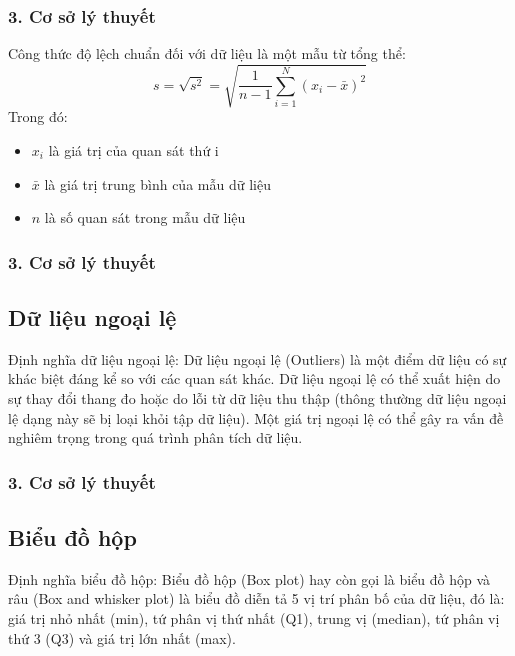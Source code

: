 \documentclass[english,10pt,table]{beamer}
\begin{document}
\begin{frame}
\frametitle{3. Cơ sở lý thuyết}
\begin{block}
{Công thức độ lệch chuẩn đối với dữ liệu là một mẫu từ tổng thể:} 
$$
s=\sqrt{s^{2}}=\sqrt{\frac{1}{n-1} \sum_{i=1}^{N}\left(x_{i}-\bar{x}\right)^{2}}
$$
Trong đó: 
\begin{itemize}
    \item $x_{i}$ là giá trị của quan sát thứ i
    \item $\bar{x}$ là giá trị trung bình của mẫu dữ liệu
    \item $n$ là số quan sát trong mẫu dữ liệu
\end{itemize}
\end{block}
\end{frame}

\begin{frame}
\frametitle{3. Cơ sở lý thuyết}
\subsection{Dữ liệu ngoại lệ}
\begin{block}
{Định nghĩa dữ liệu ngoại lệ:} 
Dữ liệu ngoại lệ (Outliers) là một điểm dữ liệu có sự khác biệt đáng kể so với các quan sát khác. Dữ liệu ngoại lệ có thể xuất hiện do sự thay đổi thang đo hoặc do lỗi từ dữ liệu thu thập (thông thường dữ liệu ngoại lệ dạng này sẽ bị loại khỏi tập dữ liệu). Một giá trị ngoại lệ có thể gây ra vấn đề nghiêm trọng trong quá trình phân tích dữ liệu.
\end{block}
\end{frame}

\begin{frame}
\frametitle{3. Cơ sở lý thuyết}
\subsection{Biểu đồ hộp}
\begin{block}
{Định nghĩa biểu đồ hộp:} 
Biểu đồ hộp (Box plot) hay còn gọi là biểu đồ hộp và râu (Box and whisker plot) là biểu đồ diễn tả 5 vị trí phân bố của dữ liệu, đó là: giá trị nhỏ nhất (min), tứ phân vị thứ nhất (Q1), trung vị (median), tứ phân vị thứ 3 (Q3) và giá trị lớn nhất (max).
\end{block}
\end{frame}
\end{document}
